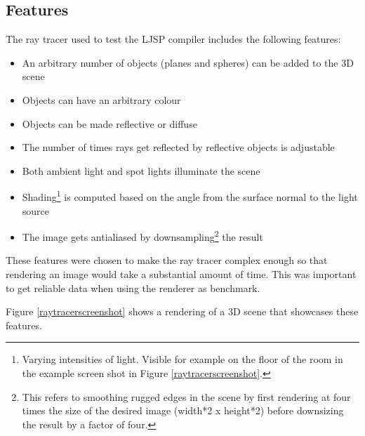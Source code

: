 \documentclass[11pt]{report}
\begin{document}
\subsection{Features}

The ray tracer used to test the LJSP compiler includes the following features:
\begin{itemize}
\item An arbitrary number of objects (planes and spheres) can be added to the 3D scene
\item Objects can have an arbitrary colour
\item Objects can be made reflective or diffuse
\item The number of times rays get reflected by reflective objects is adjustable
\item Both ambient light and spot lights illuminate the scene
\item Shading\footnote{Varying intensities of light. Visible for example on the floor of the room in the example screen shot in Figure \ref{raytracerscreenshot}.} is computed based on the angle from the surface normal to the light source
\item The image gets antialiased by downsampling\footnote{This refers to smoothing rugged edges in the scene by first rendering at four times the size of the desired image (width*2 x height*2) before downsizing the result by a factor of four.} the result 
\end{itemize}

These features were chosen to make the ray tracer complex enough so that rendering an image would take a substantial amount of time. This was important to get reliable data when using the renderer as benchmark.

Figure \ref{raytracerscreenshot} shows a rendering of a 3D scene that showcases these features.
\end{document}
